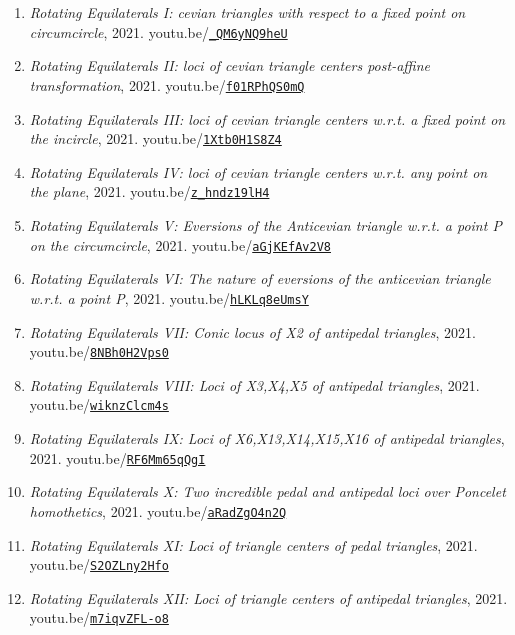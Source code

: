 \documentclass[12pt]{article}
\begin{document}
\begin{enumerate}[resume]
\item \textit{Rotating Equilaterals I: cevian triangles with respect to a fixed point on circumcircle}, 2021. youtu.be/\href{https://youtu.be/_QM6yNQ9heU}{\nolinkurl{\_QM6yNQ9heU}}
\item \textit{Rotating Equilaterals II: loci of cevian triangle centers post-affine transformation}, 2021. youtu.be/\href{https://youtu.be/f01RPhQS0mQ}{\nolinkurl{f01RPhQS0mQ}}
\item \textit{Rotating Equilaterals III: loci of cevian triangle centers w.r.t. a fixed point on the incircle}, 2021. youtu.be/\href{https://youtu.be/1Xtb0H1S8Z4}{\nolinkurl{1Xtb0H1S8Z4}}
\item \textit{Rotating Equilaterals IV: loci of cevian triangle centers w.r.t. any point on the plane}, 2021. youtu.be/\href{https://youtu.be/z_hndz19lH4}{\nolinkurl{z\_hndz19lH4}}
\item \textit{Rotating Equilaterals V: Eversions of the Anticevian triangle w.r.t. a point P on the circumcircle}, 2021. youtu.be/\href{https://youtu.be/aGjKEfAv2V8}{\nolinkurl{aGjKEfAv2V8}}
\item \textit{Rotating Equilaterals VI: The nature of eversions of the anticevian triangle w.r.t. a point P}, 2021. youtu.be/\href{https://youtu.be/hLKLq8eUmsY}{\nolinkurl{hLKLq8eUmsY}}
\item \textit{Rotating Equilaterals VII: Conic locus of X2 of antipedal triangles}, 2021. youtu.be/\href{https://youtu.be/8NBh0H2Vps0}{\nolinkurl{8NBh0H2Vps0}}
\item \textit{Rotating Equilaterals VIII: Loci of X3,X4,X5 of antipedal triangles}, 2021. youtu.be/\href{https://youtu.be/wiknzClcm4s}{\nolinkurl{wiknzClcm4s}}
\item \textit{Rotating Equilaterals IX: Loci of X6,X13,X14,X15,X16 of antipedal triangles}, 2021. youtu.be/\href{https://youtu.be/RF6Mm65qQgI}{\nolinkurl{RF6Mm65qQgI}}
\item \textit{Rotating Equilaterals X: Two incredible pedal and antipedal loci over Poncelet homothetics}, 2021. youtu.be/\href{https://youtu.be/aRadZgO4n2Q}{\nolinkurl{aRadZgO4n2Q}}
\item \textit{Rotating Equilaterals XI: Loci of triangle centers of pedal triangles}, 2021. youtu.be/\href{https://youtu.be/S2OZLny2Hfo}{\nolinkurl{S2OZLny2Hfo}}
\item \textit{Rotating Equilaterals XII: Loci of triangle centers of antipedal triangles}, 2021. youtu.be/\href{https://youtu.be/m7iqvZFL-o8}{\nolinkurl{m7iqvZFL-o8}}
\end{enumerate}
\end{document}
